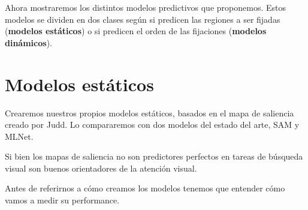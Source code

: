 \documentclass[compress]{beamer}
\begin{document}

\begin{frame}
Ahora mostraremos los distintos modelos predictivos que proponemos. Estos modelos se dividen en dos clases según si predicen las regiones a ser fijadas (\textbf{modelos estáticos}) o si predicen el orden de las fijaciones (\textbf{modelos dinámicos}).
\end{frame}

\section{Modelos estáticos}

\begin{frame}
Crearemos nuestros propios modelos estáticos, basados en el mapa de saliencia creado por Judd. Lo compararemos con dos modelos del estado del arte, SAM y MLNet. 

\medskip
Si bien los mapas de saliencia no son predictores perfectos en tareas de búsqueda visual son buenos orientadores de la atención visual.

\bigskip
\bigskip
Antes de referirnos a cómo creamos los modelos tenemos que entender cómo vamos a medir su performance.
\end{frame}
\end{document}
